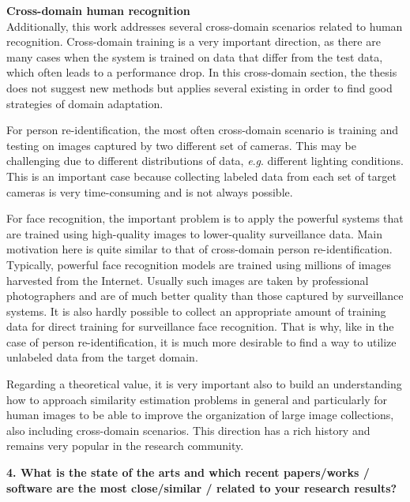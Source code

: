 \documentclass[a4paper, 11pt, oneside]{Thesis}  %
\newcommand{\eg}{\textit{e}.\textit{g}.}
\begin{document}
\textbf{Cross-domain human recognition}\\
Additionally, this work addresses several cross-domain scenarios related to human recognition. Cross-domain training is a very important direction, as there are many cases when the system is trained on data that differ from the test data, which often leads to a performance drop. In this cross-domain section, the thesis does not suggest new methods but applies several existing in order to find good strategies of domain adaptation. 

For person re-identification, the most often cross-domain scenario is training and testing on images captured by two  different set of cameras. This may be challenging due to different distributions of data, \eg{} different lighting conditions. This is an important case because collecting  labeled data from each set of target cameras is very time-consuming and is not always possible.   %

 For face recognition, the important problem is to apply the powerful systems that are trained using high-quality images to lower-quality surveillance data. Main motivation here is quite similar to that of cross-domain person re-identification. Typically, powerful face recognition models are trained using millions of images harvested from the Internet. Usually such images are taken by professional photographers and are of much better quality than those captured by surveillance systems. It is also hardly possible to collect an appropriate amount of training data for direct training for surveillance face recognition. That is why, like in the case of person re-identification, it is much more desirable to find a way to utilize unlabeled data from the target domain. 





Regarding a theoretical value, it is very important also to build an understanding how to approach similarity estimation problems in general and particularly for human images to be able to improve the organization of large image collections, also including  cross-domain scenarios. This direction has a rich history and remains very popular in the research community.


\bigskip\ident\textbf{
4. What is the state of the arts and which recent papers/works / software are the most
close/similar / related to your research results?}
\end{document}
